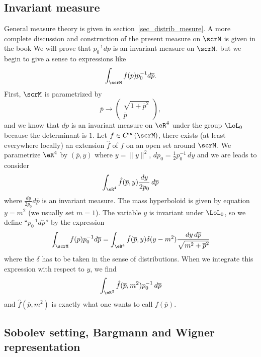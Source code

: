 \subsection{Invariant measure}

General measure theory is given in section~\ref{sec_distrib_mesure}. A more complete discussion and construction of the present measure on $\scrM$ is given in the book \cite{Reed_Simon} We will prove that $p_0^{-1}d\overline{p}$ is an invariant measure on $\scrM$, but we begin to give a sense to expressions like
\[
	\int_{\scrM} f(p)p_0^{-1}d\overline{p}.
\]
First, $\scrM$ is parametrized by
\[
	\overline{p}\to
	\begin{pmatrix}
		\sqrt{1+\overline{p}^2} \\\overline{p}
	\end{pmatrix},
\]
and we know that $dp$ is an invariant measure on $\eR^4$ under the group $\LoL_0$ because the determinant is $1$. Let $f\in C^{\infty}(\scrM)$, there exists (at least everywhere locally) an extension $\hat f$ of $f$ on an open set around $\scrM$. We parametrize $\eR^4$ by $(\overline{p},y)$ where $y=\| y \|^2$, $dp_0=\frac{ 1 }{2}p_0^{-1}\,dy$ and we are leads to consider
\[
	\int_{\eR^4}\hat f(\overline{p},y)\frac{ dy }{ 2p_0 }\,d\overline{p}
\]
where $\frac{ dy }{ 2p_0 }d\overline{p}$ is an invariant measure. The mass hyperboloid is given by equation $y=m^2$ (we usually set $m=1$). The variable $y$ is invariant under $\LoL_0$, so we define ``$p_0^{-1}d\overline{p}$'' by the expression
\begin{equation}
	\int_{\scrM}f(p)p_0^{-1}d\overline{p}= \int_{\eR^4}\hat f(\overline{p},y)\delta(y-m^2)\frac{ dy\,d\overline{p} }{ \sqrt{m^2+\overline{p}^2} }
\end{equation}
where the $\delta$ has to be taken in the sense of distributions. When we integrate this expression with respect to $y$, we find
\[
	\int_{\eR^3}\hat f(\overline{p},m^2)p_0^{-1}\,d\overline{p}
\]
and $\hat f(\overline{p},m^2)$ is exactly what one wants to call $f(\overline{p})$.

\subsection{Sobolev setting, Bargmann and Wigner representation}

